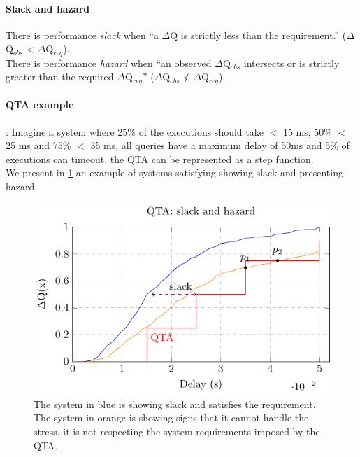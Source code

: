     \paragraph{Slack and hazard} There is performance \textit{slack} when ``a $\Delta$Q is strictly less than the requirement.'' ($\Delta$Q$_{obs}$ < $\Delta$Q$_{req}$). \\
    There is performance \textit{hazard} when ``an observed $\Delta$Q$_{obs}$ intersects or is strictly greater than the required $\Delta$Q$_{req}$'' ($\Delta$Q$_{obs} \nless \Delta$Q$_{req}$). \cite{myo}
 
    \paragraph{QTA example}: Imagine a system where 25\% of the executions should take $<$ 15 ms, 50\% $<$ 25 ms and 75\% $<$ 35 ms, all queries have a maximum delay of 50ms and 5\% of executions can timeout, the QTA can be represented as a step function. \\
    We present in \cref{fig:qta_step} an example of systems satisfying showing slack and presenting hazard.
        \begin{figure}[H]
            \begin{center}
                \includegraphics[scale=1]{tikz/cdf_qta_slack.pdf}
            \end{center}
            \caption{The system in blue is showing slack and satisfies the requirement. The system in orange is showing signs that it cannot handle the stress, it is not respecting the system requirements imposed by the QTA.}%
            \label{fig:qta_step}
        \end{figure}

